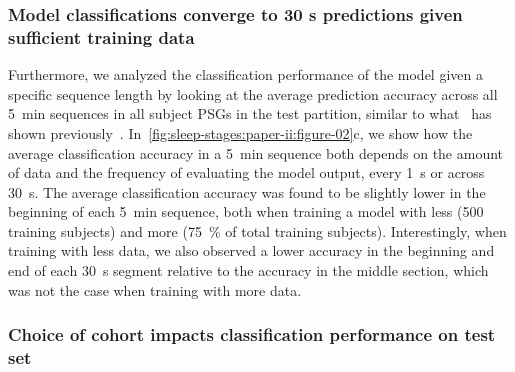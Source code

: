 \subsubsection{Model classifications converge to 30 s predictions given sufficient training data}
Furthermore, we analyzed the classification performance of the model given a specific sequence length by looking at the average prediction accuracy across all \SI{5}{\minute} sequences in all subject \acp{PSG} in the test partition, similar to what~\citeauthor{Brink-Kjaer2019} has shown previously~\cite{Brink-Kjaer2019}.
In~\cref{fig:sleep-stages:paper-ii:figure-02}c, we show how the average classification accuracy in a \SI{5}{\minute} sequence both depends on the amount of data and the frequency of evaluating the model output, \ie every \SI{1}{\second} or across \SI{30}{\second}.
The average classification accuracy was found to be slightly lower in the beginning of each \SI{5}{\minute} sequence, both when training a model with less (500 training subjects) and more (\SI{75}{\percent} of total training subjects).
Interestingly, when training with less data, we also observed a lower accuracy in the beginning and end of each \SI{30}{\second} segment relative to the accuracy in the middle section, which was not the case when training with more data.

\subsubsection{Choice of cohort impacts classification performance on test set}

